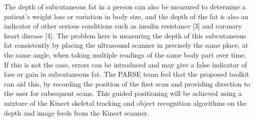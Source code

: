 The depth of subcutaneous fat in a person can also be measured to determine a patient's weight loss or variation in body size, and the depth of the fat is also an indicator of other serious conditions such as insulin resistance [3] and coronary heart disease [4]. The problem here is measuring the depth of this subcutaneous fat consistently by placing the ultrasound scanner in precisely the same place, at the same angle, when taking multiple readings of the same body part over time. If this is not the case, errors can be introduced and may give a false indicator of loss or gain in subcutaneous fat. The PARSE team feel that the proposed toolkit can aid this, by recording the position of the first scan and providing direction to the user for subsequent scans. This guided positioning will be achieved using a mixture of the Kinect skeletal tracking and object recognition algorithms on the depth and image feeds from the Kinect scanner.\\ 